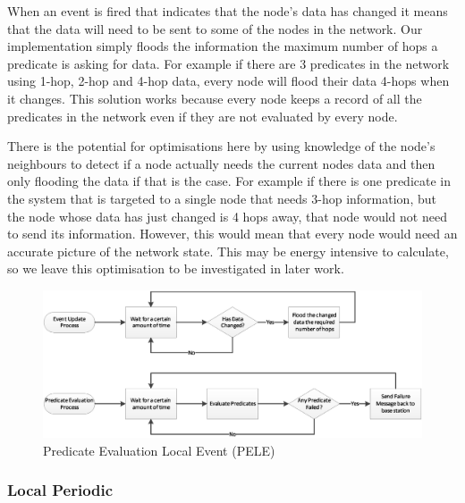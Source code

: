 When an event is fired that indicates that the node's data has changed it means that the data will need to be sent to some of the nodes in the network. Our implementation simply floods the information the maximum number of hops a predicate is asking for data. For example if there are 3 predicates in the network using 1-hop, 2-hop and 4-hop data, every node will flood their data 4-hops when it changes. This solution works because every node keeps a record of all the predicates in the network even if they are not evaluated by every node.

There is the potential for optimisations here by using knowledge of the node's neighbours to detect if a node actually needs the current nodes data and then only flooding the data if that is the case. For example if there is one predicate in the system that is targeted to a single node that needs 3-hop information, but the node whose data has just changed is 4 hops away, that node would not need to send its information. However, this would mean that every node would need an accurate picture of the network state. This may be energy intensive to calculate, so we leave this optimisation to be investigated in later work.

\begin{figure}[H]
\centering
\includegraphics[width=\linewidth]{Diagrams/pele.eps}
\caption{Predicate Evaluation Local Event (PELE)}
\end{figure}

\subsubsection{Local Periodic}

